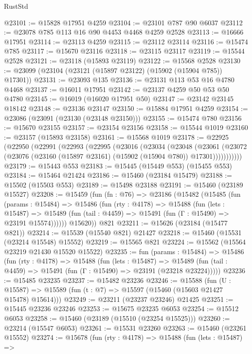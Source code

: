 \begin{lexlean}{RustStd}
\begin{coremodule}
@23101 := @15828 @17951 @4259
@23104 := @23101 @787 @90 @6037
@23112 := @23078 @785 @113 @16 @90 @4453 @4468 @4259 @2528
@23113 := @16666 @17951
@23114 := @23113 @4259
@23115 := @23112 @23114
@23116 := @15474 @785
@23117 := @15670 @23116
@23118 := @23115 @23117
@23119 := @15544 @2528
@23121 := @23118 (@15893 @23119)
@23122 := @15568 @2528
@23130 := @23099 (@23104 (@23121 (@15897 @23122) (@15902 (@15904 @785)) @17301))
@23131 := @23093 @135
@23136 := @23131 @113 @53 @16 @4780 @4468
@23137 := @16011 @17951
@23142 := @23137 @4259 @50 @53 @50 @4780
@23145 := @16019 (@16020 @17951 @50)
@23147 := @23142 @23145 @18142
@23148 := @23136 @23147
@23150 := @15884 @17951 @4259
@23154 := @23086 (@23091 (@23130 (@23148 @23150)))
@23155 := @15474 @780
@23156 := @15670 @23155
@23157 := @23154 @23156
@23158 := @15544 @1019
@23160 := @23157 (@15893 @23158)
@23161 := @15568 @1019
@23178 := @22925
    (@22950
      (@22991
        (@22993
          (@22995
            (@23016
              (@23034
                (@23048
                  (@23061
                    (@23072 (@23076 (@23160 (@15897 @23161) (@15902 (@15904 @780)) @17301)))))))))))
@23179 := @15443 @553
@23183 := @15445 (@15449 @553) (@15455 @553)
@23184 := @15464 @21424
@23186 := @15460 (@23184 @15479)
@23188 := @15502 (@15503 @553)
@23189 := @15498 @23188
@23191 := @15460 (@23189 @15527)
@23208 := @15459
    (fun (fn : @76) =>
    @23186
      (@15482
        (@15485
          (fun (params : @15484) =>
          @15486
            (fun (rty : @4178) =>
            @15488
              (fun (lets : @15487) =>
              @15489 (fun (tail : @4459) => @15491 (fun (Γ : @15490) => @23191 @15574))))))
        @15620))
    @821
@23211 := @15626 (@23184 (@15477 @821))
@23214 := @15539 (@15540 @821) @21427
@23218 := @15460 (@15531 (@23214 @15548) @15552)
@23219 := @15565 @821
@23224 := @15562 (@15564 @23219 @21430 @15520 @15522)
@23235 := fun (params : @15484) =>
  @15486
    (fun (rty : @4178) =>
    @15488
      (fun (lets : @15487) =>
      @15489 (fun (tail : @4459) => @15491 (fun (Γ : @15490) => @23191 (@23218 @23224)))))
@23236 := @15485 @23235
@23237 := @15482 @23236
@23246 := @15588
    (fun (U : @15587) => @15589 (fun (t : @7) => @15597 (@15460 (@15603 @21427 @15478) @15614)))
@23249 := @23211 (@23237 @23246) @21425
@23251 := @15445 @23236 @23246
@23253 := @15675 @23235 @6053
@23254 := @15512 @6053
@23258 := @15460 (@23189 (@15510 (@23254 @15525)))
@23260 := @23214 (@15547 @6053)
@23261 := @15531 @23260
@23263 := @15460 (@23261 @15552)
@23274 := @15678
    (fun (rty : @4178) =>
    @15488
      (fun (lets : @15487) =>

\end{coremodule}
\end{lexlean}
